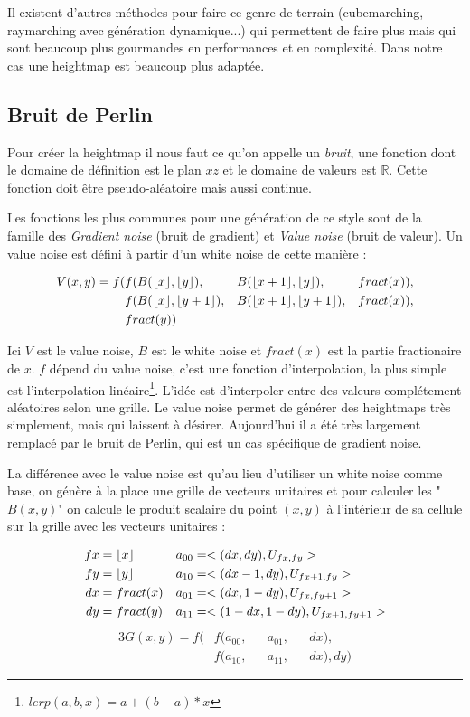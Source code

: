 \documentclass[11pt]{article} %
\DeclarePairedDelimiter\floor{\lfloor}{\rfloor}%
\DeclarePairedDelimiter\fract{fract(}{)}
\begin{document}

Il existent d'autres méthodes pour faire ce genre de terrain (cubemarching, raymarching avec génération dynamique...) qui permettent de faire plus mais qui sont beaucoup plus gourmandes en performances et en complexité. Dans notre cas une heightmap est beaucoup plus adaptée.

\subsection{Bruit de Perlin}

Pour créer la heightmap il nous faut ce qu'on appelle un \textit{bruit}, une fonction dont le domaine de définition est le plan $xz$ et le domaine de valeurs est $\mathbb{R}$. Cette fonction doit être pseudo-aléatoire mais aussi continue.


Les fonctions les plus communes pour une génération de ce style sont de la famille des \textit{Gradient noise} (bruit de gradient) et \textit{Value noise} (bruit de valeur).
Un value noise est défini à partir d'un white noise de cette manière :

\begin{alignat*}{3}
	V(x,y) =f( &f(B(\floor{x},\floor{y}), &&B(\floor{x+1},\floor{y}), &&\fract{x}),\\
			&f(B(\floor{x},\floor{y+1}), &&B(\floor{x+1},\floor{y+1}), &&\fract{x}),\\
			&\fract{y})
\end{alignat*}

Ici $V$ est le value noise, $B$ est le white noise et $fract(x)$ est la partie fractionaire de $x$. $f$ dépend du value noise, c'est une fonction d'interpolation, la plus simple est l'interpolation linéaire\footnote{$lerp(a,b,x) = a+(b-a)*x$}.
L'idée est d'interpoler entre des valeurs complétement aléatoires selon une grille. Le value noise permet de générer des heightmaps très simplement, mais qui laissent à désirer. Aujourd'hui il a été très largement remplacé par le bruit de Perlin, qui est un cas spécifique de gradient noise.

La différence avec le value noise est qu'au lieu d'utiliser un white noise comme base, on génère à la place une grille de vecteurs unitaires et pour calculer les "$B(x,y)$" on calcule le produit scalaire du point $(x,y)$ à l'intérieur de sa cellule sur la grille avec les vecteurs unitaires :

\begin{align*}
	fx&=\floor{x} & a_{00}&=<(dx,dy), U_{fx,fy}>\\
	fy&=\floor{y} & a_{10}&=<(dx-1,dy), U_{fx+1,fy}>\\
	dx&=\fract{x} & a_{01}&=<(dx,1-dy), U_{fx,fy+1}>\\
	dy&=\fract{y} & a_{11}&=<(1-dx,1-dy), U_{fx+1,fy+1}>
\end{align*}
\begin{alignat*}{3}
	G(x,y) =f( &f(a_{00}, &&a_{01}, &&dx),\\
			&f(a_{10}, &&a_{11}, &&dx), dy)
\end{alignat*}
\end{document}
